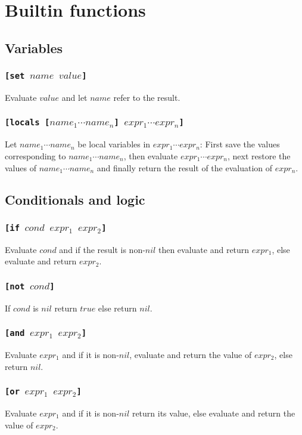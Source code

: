 \section{Builtin functions}
\subsection{Variables}
\subsubsection{\tt{[set }$name$ $value$\tt{]}}
Evaluate $value$ and let $name$ refer to the result.

\subsubsection{\tt{[locals [}$name_1 \cdots name_n$\tt{]} $expr_1 \cdots expr_n$\tt{]}}
Let $name_1 \cdots name_n$ be local variables in $expr_1 \cdots expr_n$: First save the values corresponding to $name_1 \cdots name_n$, then evaluate $expr_1 \cdots expr_n$, next restore the values of $name_1 \cdots name_n$ and finally return the result of the evaluation of $expr_n$.

\subsection{Conditionals and logic}
\subsubsection{\tt{[if }$cond$ $expr_1$ $expr_2$\tt{]}}
Evaluate $cond$ and if the result is non-$nil$ then evaluate and return $expr_1$, else evaluate and return $expr_2$.

\subsubsection{\tt{[not }$cond$\tt{]}}
If $cond$ is $nil$ return $true$ else return $nil$.

\subsubsection{\tt{[and }$expr_1$ $expr_2$\tt{]}}
Evaluate $expr_1$ and if it is non-$nil$, evaluate and return the value of $expr_2$, else return $nil$.

\subsubsection{\tt{[or }$expr_1$ $expr_2$\tt{]}}
Evaluate $expr_1$ and if it is non-$nil$ return its value, else evaluate and return the value of $expr_2$.

